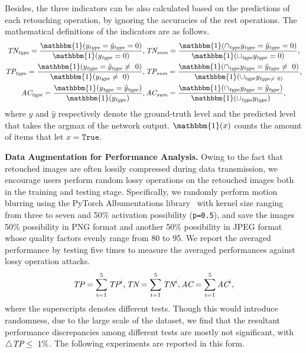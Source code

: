 \documentclass[sigconf]{acmart}
\begin{document}
Besides, the three indicators can be also calculated based on the predictions of each retouching operation, by ignoring the accuracies of the rest operations. 
The mathematical definitions of the indicators are as follows. 
\begin{equation}
\label{eqn_eval}
\begin{gathered}
\emph{TN}_{\emph{type}}=\frac{\mathbbm{1}(y_{\emph{type}}=\hat{y}_\emph{type}=0)}{\mathbbm{1}(y_{\emph{type}}=0)},
\emph{TN}_{\emph{sum}}=\frac{\mathbbm{1}(\cap_{\emph{type}}y_{\emph{type}}=\hat{y}_\emph{type}=0)}{\mathbbm{1}(\cup_{\emph{type}}y_{\emph{type}}=0)},\\
\emph{TP}_{\emph{type}}=\frac{\mathbbm{1}(y_{\emph{type}}=\hat{y}_\emph{type}\neq~0)}{\mathbbm{1}(y_{\emph{type}}\neq~0)},
\emph{TP}_{\emph{sum}}=\frac{\mathbbm{1}(\cap_{\emph{type}}y_{\emph{type}}=\hat{y}_\emph{type}\neq~0)}{\mathbbm{1}(\cup_{\emph{type}}y_{\emph{type}\neq~0)}},\\
\emph{AC}_{\emph{type}}=\frac{\mathbbm{1}(y_{\emph{type}}=\hat{y}_\emph{type})}{\mathbbm{1}(y_{\emph{type}})},
\emph{AC}_{\emph{sum}}=\frac{\mathbbm{1}(\cap_{\emph{type}}y_{\emph{type}}=\hat{y}_\emph{type})}{\mathbbm{1}(\cup_{\emph{type}}y_{\emph{type}})},
\end{gathered}
\end{equation}
where $y$ and $\hat{y}$ respectively denote the ground-truth level and the predicted level that takes the argmax of the network output. 
$\mathbbm{1}(x)$ counts the amount of items that let $x=\texttt{True}$.  

\noindent\textbf{Data Augmentation for Performance Analysis.}
Owing to the fact that retouched images are often lossily compressed during data transmission, we encourage users perform random lossy operations on the retouched images both in the training and testing stage.
Specifically, we randomly perform motion blurring using the PyTorch Albumentations library~\cite{Albumentations} with kernel size ranging from three to seven and 50\% activation possibility (\texttt{p=0.5}), and save the images 50\% possibility in PNG format and another 50\% possibility in JPEG format whose quality factors evenly range from 80 to 95.
We report the averaged performance by testing five times to measure the averaged performances against lossy operation attacks.
\begin{equation}
\label{eqn:average}
\emph{TP}=\sum_{i=1}^5{\emph{TP}^i}, \emph{TN}=\sum_{i=1}^5{\emph{TN}^i}, \emph{AC}=\sum_{i=1}^5{\emph{AC}^i},
\end{equation}
where the superscripts denotes different tests.
Though this would introduce randomness, due to the large scale of the dataset, we find that the resultant performance discrepancies among different tests are mostly not significant, with $\triangle\emph{TP}\leq~1\%$. The following experiments are reported in this form.
\end{document}
